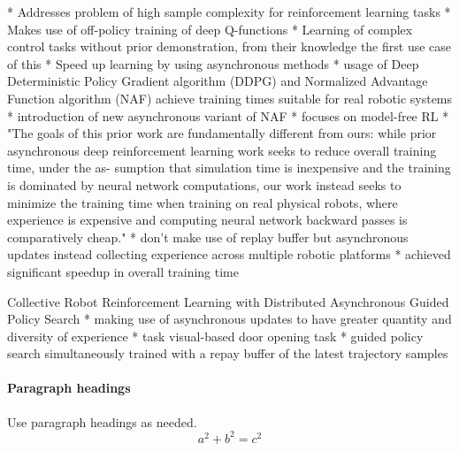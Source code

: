     * Addresses problem of high sample complexity for reinforcement learning tasks
    * Makes use of off-policy training of deep Q-functions
    * Learning of complex control tasks without prior demonstration, from their knowledge the first use case of this
    * Speed up learning by using asynchronous methods
    * usage of Deep Deterministic Policy Gradient algorithm (DDPG) and Normalized Advantage Function algorithm (NAF) achieve training times suitable for real robotic systems
    * introduction of new asynchronous variant of NAF
    * focuses on model-free	RL
    * "The
    goals of this prior work are fundamentally different from
    ours: while prior asynchronous deep reinforcement learning
    work seeks to reduce overall training time, under the as-
    sumption that simulation time is inexpensive and the training
    is dominated by neural network computations, our work
    instead seeks to minimize the training time when training
    on real physical robots, where experience is expensive and
    computing neural network backward passes is comparatively
    cheap."
    * don't make use of replay buffer but asynchronous updates instead collecting experience across multiple robotic platforms
    * achieved significant speedup in overall training time
    
    
    Collective Robot Reinforcement Learning with Distributed
    Asynchronous Guided Policy Search
    * making use of asynchronous updates to have greater quantity and diversity of experience
    * task visual-based door opening task
    * guided policy search simultaneously trained with a repay buffer of the latest trajectory samples
    
    \paragraph{Paragraph headings} Use paragraph headings as needed.
    \begin{equation}
        a^2+b^2=c^2
    \end{equation}
    
